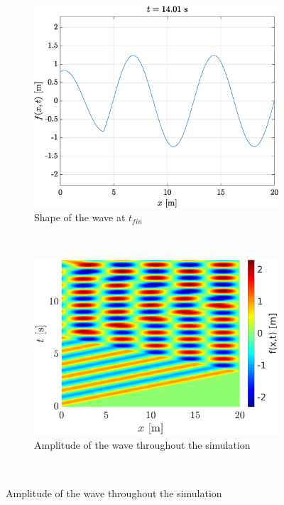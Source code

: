 \documentclass[a4paper,12pt,twoside]{article}
\begin{document}
    \begin{figure}[h!]
    \begin{subfigure}{0.5\textwidth}
    \includegraphics[width=\textwidth]{graphs/ex1ffixe.eps}
    \caption{Shape of the wave at $t_{fin}$}
    \label{fig:ex1fixf}
    \end{subfigure}
    ~
    \begin{subfigure}{0.55\textwidth}
    \includegraphics[width=\textwidth]{graphs/ex1xtfixe.eps}
    \caption{Amplitude of the wave throughout the simulation}
    \label{fig:ex1fixxt}
    \end{subfigure}\


\end{figure}
\end{document}
